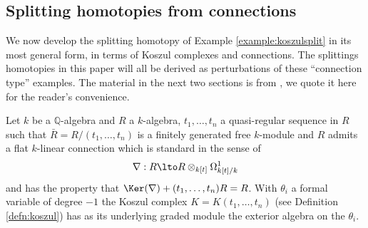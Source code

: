 



\subsection{Splitting homotopies from connections}

We now develop the splitting homotopy of Example \ref{example:koszulsplit} in its most general form, in terms of Koszul complexes and connections. The splittings homotopies in this paper will all be derived as perturbations of these ``connection type'' examples. The material in the next two sections is from \cite{??}, we quote it here for the reader's convenience.

Let $k$ be a $\mathbb{Q}$-algebra and $R$ a $k$-algebra, $t_1,\ldots, t_n$ a quasi-regular sequence in $R$ such that $\bar{R} = R/(t_1,\ldots,t_n)$ is a finitely generated free $k$-module and $R$ admits a flat $k$-linear connection which is standard in the sense of \cite{??}
\[
\nabla: R \lto R \otimes_{k[t]} \Omega^1_{k[t]/k}
\]
and has the property that $\Ker(\nabla) + (t_1,\ldots,t_n) R = R$. With $\theta_i$ a formal variable of degree $-1$ the Koszul complex $K = K(t_1,\ldots,t_n)$ (see Definition \ref{defn:koszul}) has as its underlying graded module the exterior algebra on the $\theta_i$.

